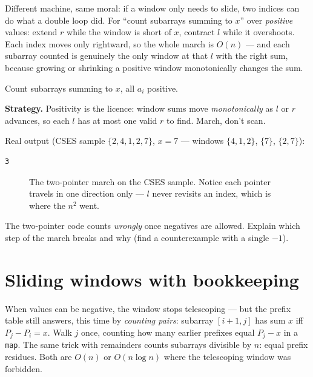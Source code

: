 Different machine, same moral: if a window only needs to slide, two
indices can do what a double loop did. For ``count subarrays summing
to $x$'' over \emph{positive} values: extend $r$ while the window is
short of $x$, contract $l$ while it overshoots. Each index moves only
rightward, so the whole march is $O(n)$ --- and each subarray counted
is genuinely the only window at that $l$ with the right sum, because
growing or shrinking a positive window monotonically changes the sum.

\begin{example}\label{ex:sums1}
Count subarrays summing to $x$, all $a_i$ positive.
\par\smallskip
\textbf{Strategy.} Positivity is the licence: window sums move
\emph{monotonically} as $l$ or $r$ advances, so each $l$ has at most
one valid $r$ to find. March, don't scan.
\par\smallskip
\begin{solution}

Real output (CSES sample $\{2,4,1,2,7\}$, $x{=}7$ --- windows
$\{4,1,2\}$, $\{7\}$, $\{2,7\}$):
\begin{lstlisting}[numbers=none]
3
\end{lstlisting}
\end{solution}
\end{example}

\begin{figure}[ht]\centering

\caption{The two-pointer march on the CSES sample. Notice each pointer
travels in one direction only --- $l$ never revisits an index, which is
where the $n^2$ went.}
\label{fig:twoptr}
\end{figure}

\begin{exercise}[easy]\label{exr:positivity}
The two-pointer code counts \emph{wrongly} once negatives are allowed.
Explain which step of the march breaks and why (find a counterexample
with a single $-1$).
\end{exercise}

\section{Sliding windows with bookkeeping}\label{sec:window}

When values can be negative, the window stops telescoping --- but the
prefix table still answers, this time by \emph{counting pairs}:
subarray $[i{+}1,j]$ has sum $x$ iff $P_j - P_i = x$. Walk $j$ once,
counting how many earlier prefixes equal $P_j - x$ in a \texttt{map}.
The same trick with remainders counts subarrays divisible by $n$:
equal prefix residues. Both are $O(n)$ or $O(n \log n)$ where the
telescoping window was forbidden.

